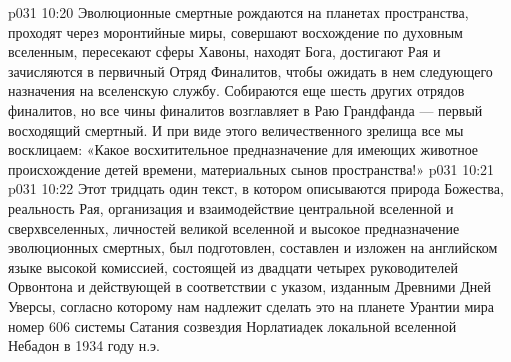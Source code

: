 \vs p031 10:20 \pc Эволюционные смертные рождаются на планетах пространства, проходят через моронтийные миры, совершают восхождение по духовным вселенным, пересекают сферы Хавоны, находят Бога, достигают Рая и зачисляются в первичный Отряд Финалитов, чтобы ожидать в нем следующего назначения на вселенскую службу. Собираются еще шесть других отрядов финалитов, но все чины финалитов возглавляет в Раю Грандфанда --- первый восходящий смертный. И при виде этого величественного зрелища все мы восклицаем: «Какое восхитительное предназначение для имеющих животное происхождение детей времени, материальных сынов пространства!»
\vs p031 10:21 
\separatorline
\vsetoff
\vs p031 10:22 Этот тридцать один текст, в котором описываются природа Божества, реальность Рая, организация и взаимодействие центральной вселенной и сверхвселенных, личностей великой вселенной и высокое предназначение эволюционных смертных, был подготовлен, составлен и изложен на английском языке высокой комиссией, состоящей из двадцати четырех руководителей Орвонтона и действующей в соответствии с указом, изданным Древними Дней Уверсы, согласно которому нам надлежит сделать это на планете Урантии мира номер 606 системы Сатания созвездия Норлатиадек локальной вселенной Небадон в 1934 году н.э.
